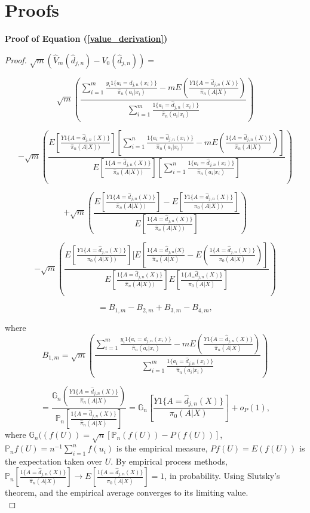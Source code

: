 \documentclass{article}
\begin{document}

\clearpage

\appendix
\renewcommand{\thetable}{S\arabic{table}}
\setcounter{table}{0}

\renewcommand{\thefigure}{S\arabic{figure}}
\setcounter{figure}{0}

\section{Proofs\label{app1}}
\textbf{Proof of Equation (\ref{value_derivation})}
\begin{proof}
$\sqrt{m}(\hat{V}_{m}(\hat{d}_{j,n})-V_0(\hat{d}_{j,n}))=$

$$\sqrt{m}(\frac{\sum_{i=1}^{m} \frac{y_i 1\{a_i=\hat{d}_{j,n}(x_i)\}}{\hat{\pi}_n(a_i|x_i)}-m E(\frac{Y1\{A=\hat{d}_{j,n}(X)\}}{\hat{\pi}_n(A|X)})}{\sum_{i=1}^{m}\frac{1\{a_i=\hat{d}_{j,n}(x_i)\}}{\hat{\pi}_n(a_i|x_i)}})$$

$$-\sqrt{m}(\frac{
    E[\frac{Y 1\{A=\hat{d}_{j,n}(X)\}}{\hat{\pi}_n(A|X))}]
    [\sum_{i=1}^{n}\frac{1\{a_i=\hat{d}_{j,n}(x_i)\}}{\hat{\pi}_n(a_i|x_i)}-m E(\frac{1\{A=\hat{d}_{j,n}(X)\}}{\hat{\pi}_n(A|X)})]}
    {E[\frac{1\{A=\hat{d}_{j,n}(X)\}}{\hat{\pi}_n(A|X))}]
    [\sum_{i=1}^{n}\frac{1\{a_i=\hat{d}_{j,n}(x_i)\}}{\hat{\pi}_n(a_i|x_i)}]})$$

$$+\sqrt{m}\left(\frac{E[\frac{Y 1\{A=\hat{d}_{j,n}(X)\}}{\hat{\pi}_n(A|X))}]-E[\frac{Y 1\{A=\hat{d}_{j,n}(X)\}}{\pi_0(A|X))}]}{E[\frac{1\{A=\hat{d}_{j,n}(X)\}}{\hat{\pi}_n(A|X))}]}\right)$$

$$-\sqrt{m}(\frac{
    E[\frac{Y 1\{A=\hat{d}_{j,n}(X)\}}{\pi_0(A|X))}]
    [E[\frac{1\{A=\hat{d}_{j,n}(X\}}{\hat{\pi}_n(A|X)}-E(\frac{1\{A=\hat{d}_{j,n}(X)\}}{\pi_0(A|X)})]}
    {E[\frac{1\{A=\hat{d}_{j,n}(X)\}}{\hat{\pi}_n(A|X))}]
    E[\frac{1\{A_=\hat{d}_{j,n}(X)\}}{\pi_0(A|X)}]})$$

    $$ = B_{1,m}-B_{2,m}+B_{3,m}-B_{4,m},$$

where 
    $$B_{1,m} = \sqrt{m}(\frac{\sum_{i=1}^{m} \frac{y_i 1\{a_i=\hat{d}_{j,n}(x_i)\}}{\hat{\pi}_n(a_i|x_i)}-m E(\frac{Y1\{A=\hat{d}_{j,n}(X)\}}{\hat{\pi}_n(A|X)})}{\sum_{i=1}^{m}\frac{1\{a_i=\hat{d}_{j,n}(x_i)\}}{\hat{\pi}_n(a_i|x_i)}})$$
    
    $$=\frac{\mathbb{G}_{n}(\frac{Y1\{A=\hat{d}_{j,n}(X)\}}{\hat{\pi}_n(A|X)})}
    {\mathbb{P}_{n}[\frac{1\{A=\hat{d}_{j,n}(X)\}}{\hat{\pi}_n(A|X)}]} = \mathbb{G}_{n} [\frac{Y1\{A=\hat{d}_{j,n}(X)\}}{\pi_0(A|X)}]+o_P(1),$$
where $\mathbb{G}_{n}((f(U)) = \sqrt{n}[\mathbb{P}_{n}(f(U))-P(f(U))]$, $\mathbb{P}_{n}f(U)=n^{-1}\sum_{i=1}^{n}f(u_i)$ is the empirical measure, $Pf(U)=E(f(U))$ is the expectation taken over $U$. By empirical process methods, $\mathbb{P}_n[\frac{1\{A=\hat{d}_{j,n}(X)\}}{\hat{\pi}_n(A|X)}] \rightarrow E[\frac{1\{A=\hat{d}_{j,n}(X)\}}{\pi_{0}(A|X)}]=1$, in probability. Using Slutsky's theorem, and the empirical average converges to its limiting value.\\


\end{proof}
\end{document}
